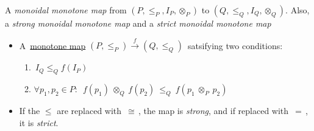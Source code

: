 A \emph{monoidal monotone map} from $(P,\leq_P,I_P,\otimes_P)$ to $(Q, \leq_Q,I_Q,\otimes_Q)$. Also, a \emph{strong monoidal monotone map} and a \emph{strict monoidal monotone map}

\begin{itemize}
    \item A \,\href{doc/1 math/Seven Sketches in Compositionality/Chapter 1: Generative Effects/4 Monotone maps/1 Monotone map}{monotone map} $(P,\leq_P) \xrightarrow{f} (Q,\leq_Q)$\, satsifying two conditions:
          \begin{enumerate}
            \item \,$I_Q \leq_Q f(I_P)$\,
            \item $\forall p_1,p_2 \in P:$ \,$f(p_1)\ \otimes_Q\ f(p_2)\ \leq_Q\ f(p_1\ \otimes_P\ p_2)$\,
          \end{enumerate}
    \item If the $\leq$ are replaced with \,$\cong$\,, the map is \emph{strong}, and if replaced with \,$=$\,, it is \emph{strict}.
  \end{itemize}

